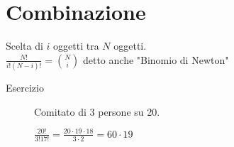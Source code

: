 \documentclass[12pt]{article}
\begin{document}
\section{Combinazione}
Scelta di \(i\) oggetti tra \(N\) oggetti.\\
\(\frac{N!}{i!(N-i)!}=\binom{N}{i}\) detto anche "Binomio di Newton"
\begin{description}
    \item[Esercizio] Comitato di 3 persone su 20.
    \item[] \(\frac{20!}{3!17!}=\frac{20\cdot 19 \cdot 18}{3\cdot 2}= 60\cdot 19\) 
\end{description}
\end{document}

